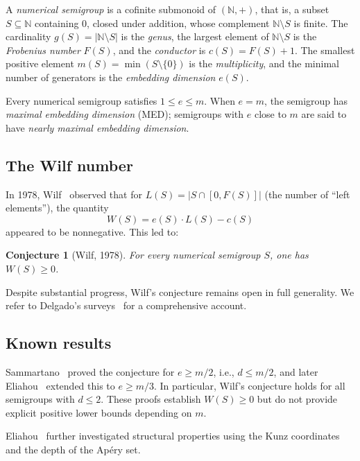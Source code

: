 \documentclass[11pt]{amsart}
\newtheorem{conjecture}[theorem]{Conjecture}
\theoremstyle{definition}
\theoremstyle{remark}
\newcommand{\NN}{\mathbb{N}}
\begin{document}
A \emph{numerical semigroup} is a cofinite submonoid of $(\NN, +)$,
that is, a subset $S \subseteq \NN$ containing $0$, closed under addition,
whose complement $\NN \setminus S$ is finite.
The cardinality $g(S) = |\NN \setminus S|$ is the \emph{genus},
the largest element of $\NN \setminus S$ is the \emph{Frobenius number} $F(S)$,
and the \emph{conductor} is $c(S) = F(S) + 1$.
The smallest positive element $m(S) = \min(S \setminus \{0\})$ is the \emph{multiplicity},
and the minimal number of generators is the \emph{embedding dimension} $e(S)$.

Every numerical semigroup satisfies $1 \le e \le m$.
When $e = m$, the semigroup has \emph{maximal embedding dimension} (MED);
semigroups with $e$ close to $m$ are said to have \emph{nearly maximal embedding dimension}.

\subsection{The Wilf number}
In 1978, Wilf~\cite{Wilf1978} observed that for
$L(S) = |S \cap [0, F(S)]|$ (the number of ``left elements''), the quantity
\begin{equation}\label{eq:wilf-number}
  W(S) = e(S) \cdot L(S) - c(S)
\end{equation}
appeared to be nonneg\-ative.  This led to:

\begin{conjecture}[Wilf, 1978]\label{conj:wilf}
For every numerical semigroup $S$, one has $W(S) \ge 0$.
\end{conjecture}

Despite substantial progress,
Wilf's conjecture remains open in full generality.
We refer to Delgado's surveys~\cite{Delgado2019, Delgado2020}
for a comprehensive account.

\subsection{Known results}

Sammartano~\cite{Sammartano2012} proved the conjecture for $e \ge m/2$,
i.e., $d \le m/2$, and later
Eliahou~\cite{Eliahou2018, Eliahou2020} extended this to $e \ge m/3$.
In particular, Wilf's conjecture holds for all semigroups with $d \le 2$.
These proofs establish $W(S) \ge 0$ but do not provide explicit positive lower bounds
depending on $m$.

Eliahou~\cite{Eliahou2024} further investigated structural properties
using the Kunz coordinates and the depth of the Ap\'ery set.
\end{document}
